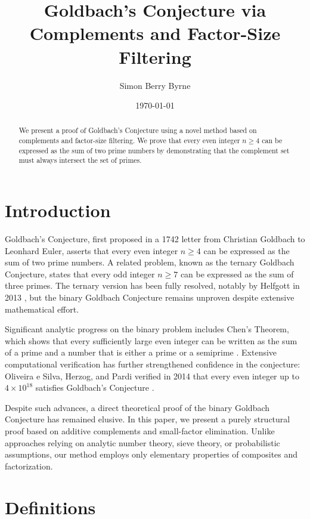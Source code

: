 \documentclass[11pt]{article}
\title{Goldbach's Conjecture via Complements and Factor-Size Filtering}
\author{Simon Berry Byrne}
\date{\today}
\begin{document}
	
	\maketitle
	
	\begin{abstract}
		We present a proof of Goldbach's Conjecture using a novel method based on complements and factor-size filtering. We prove that every even integer \( n \geq 4 \) can be expressed as the sum of two prime numbers by demonstrating that the complement set must always intersect the set of primes.
	\end{abstract}
	
	\section{Introduction}
	
	Goldbach's Conjecture, first proposed in a 1742 letter from Christian Goldbach to Leonhard Euler, asserts that every even integer \( n \geq 4 \) can be expressed as the sum of two prime numbers. A related problem, known as the ternary Goldbach Conjecture, states that every odd integer \( n \geq 7 \) can be expressed as the sum of three primes. The ternary version has been fully resolved, notably by Helfgott in 2013 \cite{Helfgott2013}, but the binary Goldbach Conjecture remains unproven despite extensive mathematical effort.
	
	Significant analytic progress on the binary problem includes Chen's Theorem, which shows that every sufficiently large even integer can be written as the sum of a prime and a number that is either a prime or a semiprime \cite{Chen1973}. Extensive computational verification has further strengthened confidence in the conjecture: Oliveira e Silva, Herzog, and Pardi verified in 2014 that every even integer up to \( 4 \times 10^{18} \) satisfies Goldbach's Conjecture \cite{Oliveira2014}.
	
	Despite such advances, a direct theoretical proof of the binary Goldbach Conjecture has remained elusive. In this paper, we present a purely structural proof based on additive complements and small-factor elimination. Unlike approaches relying on analytic number theory, sieve theory, or probabilistic assumptions, our method employs only elementary properties of composites and factorization.
	
	
	\section{Definitions}
	
\end{document}

